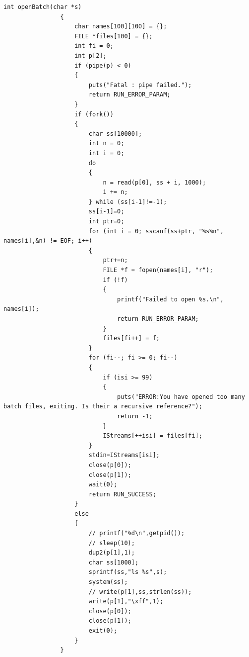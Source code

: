 \documentclass{article}
\begin{document}
\begin{Verbatim}[gobble=8]
                int openBatch(char *s)
                {
                    char names[100][100] = {};
                    FILE *files[100] = {};
                    int fi = 0;
                    int p[2];
                    if (pipe(p) < 0)
                    {
                        puts("Fatal : pipe failed.");
                        return RUN_ERROR_PARAM;
                    }
                    if (fork())
                    {
                        char ss[10000];
                        int n = 0;
                        int i = 0;
                        do
                        {
                            n = read(p[0], ss + i, 1000);
                            i += n;
                        } while (ss[i-1]!=-1);
                        ss[i-1]=0;
                        int ptr=0;
                        for (int i = 0; sscanf(ss+ptr, "%s%n", names[i],&n) != EOF; i++)
                        {
                            ptr+=n;
                            FILE *f = fopen(names[i], "r");
                            if (!f)
                            {
                                printf("Failed to open %s.\n", names[i]);
                                return RUN_ERROR_PARAM;
                            }
                            files[fi++] = f;
                        }
                        for (fi--; fi >= 0; fi--)
                        {
                            if (isi >= 99)
                            {
                                puts("ERROR:You have opened too many batch files, exiting. Is their a recursive reference?");
                                return -1;
                            }
                            IStreams[++isi] = files[fi];
                        }
                        stdin=IStreams[isi];
                        close(p[0]);
                        close(p[1]);
                        wait(0);
                        return RUN_SUCCESS;
                    }
                    else
                    {
                        // printf("%d\n",getpid());
                        // sleep(10);
                        dup2(p[1],1);
                        char ss[1000];
                        sprintf(ss,"ls %s",s);
                        system(ss);
                        // write(p[1],ss,strlen(ss));
                        write(p[1],"\xff",1);
                        close(p[0]);
                        close(p[1]);
                        exit(0);
                    }
                }
            \end{Verbatim}
\end{document}
